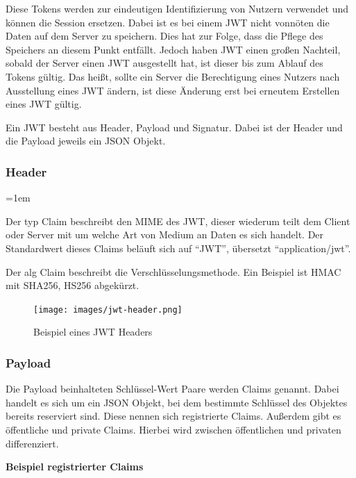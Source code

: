 \documentclass[paper=a4,fontsize=12pt,parskip=half]{scrartcl}
\begin{document}
	Diese Tokens werden zur eindeutigen Identifizierung von Nutzern verwendet und können die Session ersetzen. Dabei ist es bei einem \gls{JWT} nicht vonnöten die Daten auf dem Server zu speichern. Dies hat zur Folge, dass die Pflege des Speichers an diesem Punkt entfällt. Jedoch haben \gls{JWT} einen großen Nachteil, sobald der Server einen \gls{JWT} ausgestellt hat, ist dieser bis zum Ablauf des Tokens gültig. Das heißt, sollte ein Server die Berechtigung eines Nutzers nach Ausstellung eines \gls{JWT} ändern, ist diese Änderung erst bei erneutem Erstellen eines \gls{JWT} gültig.
	
	Ein \gls{JWT} besteht aus Header, Payload und Signatur. Dabei ist der Header und die Payload jeweils ein \gls{JSON} Objekt.
	
	\subsubsection{Header}
	\label{sec: jwt_header}
	
	\begin{description}
		\leftskip=1em
		\item[typ] Der typ Claim beschreibt den \gls{MIME} des \gls{JWT}, dieser wiederum teilt dem Client oder Server mit um welche Art von Medium an Daten es sich handelt. Der Standardwert dieses Claims beläuft sich auf \enquote{JWT}, übersetzt \enquote{application/jwt}.
		\item[alg] Der alg Claim beschreibt die Verschlüsselungsmethode. Ein Beispiel ist \gls{HMAC} mit \gls{SHA256}, HS256 abgekürzt.
	\end{description}
	
	\begin{figure}[h]
		\texttt{[image: images/jwt-header.png]}
		\caption{Beispiel eines \gls{JWT} Headers }
		\label{fig:jwt-header}
	\end{figure}
	
	\subsubsection{Payload}
	\label{sec: jwt-payload}
	
	Die Payload beinhalteten Schlüssel-Wert Paare werden Claims genannt. Dabei handelt es sich um ein JSON Objekt, bei dem bestimmte Schlüssel des Objektes bereits reserviert sind. Diese nennen sich registrierte Claims. Außerdem gibt es öffentliche und private Claims. Hierbei wird zwischen öffentlichen und privaten differenziert.
		
	\noindent
	\textbf{Beispiel registrierter Claims}
	
\end{document}
